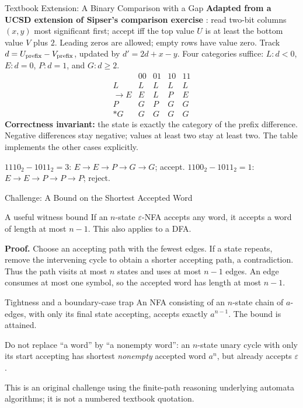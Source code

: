 \documentclass[10pt]{beamer}
\begin{document}
\begin{frame}{Textbook Extension: A Binary Comparison with a Gap}
  \small
  \textbf{Adapted from a UCSD extension of Sipser's comparison exercise}
  \cite{comparison-source}: read two-bit columns $(x,y)$ most significant
  first; accept iff the top value $U$ is at least the bottom value $V$ plus $2$.
  Leading zeros are allowed; empty rows have value zero.
  \pause
  Track $d=U_{\rm prefix}-V_{\rm prefix}$, updated by $d'=2d+x-y$.
  Four categories suffice:
  $L:d<0$, $E:d=0$, $P:d=1$, and $G:d\ge2$.
  \[
    \begin{array}{c|cccc}
      &00&01&10&11\\\hline
      L&L&L&L&L\\
      \to E&E&L&P&E\\
      P&G&P&G&G\\
      *G&G&G&G&G
    \end{array}
  \]
  \pause
  \textbf{Correctness invariant:} the state is exactly the category of the
  prefix difference. Negative differences stay negative; values at least
  two stay at least two. The table implements the other cases explicitly.
  \par\smallskip
  $1110_2-1011_2=3$: $E\to E\to P\to G\to G$; accept.
  $1100_2-1011_2=1$: $E\to E\to P\to P\to P$; reject.
\end{frame}

\begin{frame}{Challenge: A Bound on the Shortest Accepted Word}
  \small
  \begin{block}{A useful witness bound}
    If an $n$-state $\varepsilon$-NFA accepts any word, it accepts a word
    of length at most $n-1$. This also applies to a DFA.
  \end{block}
  \pause
  \textbf{Proof.} Choose an accepting path with the fewest edges.
  If a state repeats, remove the intervening cycle to obtain a shorter
  accepting path, a contradiction. Thus the path visits at most $n$ states
  and uses at most $n-1$ edges. An edge consumes at most one symbol,
  so the accepted word has length at most $n-1$.
  \pause
  \begin{exampleblock}{Tightness and a boundary-case trap}
    An NFA consisting of an $n$-state chain of $a$-edges, with only its
    final state accepting, accepts exactly $a^{n-1}$. The bound is attained.
    \par\smallskip
    Do not replace ``a word'' by ``a nonempty word'': an $n$-state unary
    cycle with only its start accepting has shortest \emph{nonempty}
    accepted word $a^n$, but already accepts $\varepsilon$.
  \end{exampleblock}
  This is an original challenge using the finite-path reasoning underlying
  automata algorithms; it is not a numbered textbook quotation.
\end{frame}
\end{document}
